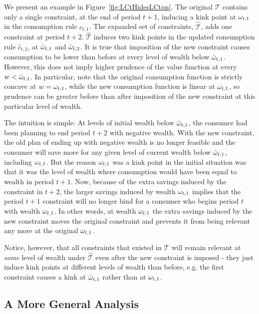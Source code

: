 We present an example in Figure~\ref{fig:LCtHidesLCtpn}. The original $\mathcal{T}$ contains only a single constraint, at the end of period $t+1$, inducing a kink point at $\omega_{t,1}$ in the consumption rule $c_{t,1}$. The expanded set of constraints, $\hat{\mathcal{T}}$, adds one constraint at period $t+2$. $\hat{\mathcal{T}}$ induces two kink points in the updated consumption rule $\hat{c}_{t,2}$, at $\hat{\omega}_{t,1}$ and $\hat{\omega}_{t,2}$.  It is true that imposition of the new constraint causes consumption to be lower than before at every level of wealth below $\hat{\omega}_{t,1}$.  However, this does not imply higher prudence of the value function at every $w <\hat{\omega}_{t,1}$.  In particular, note that the original consumption function is strictly concave at $w = \omega_{t,1}$, while the new consumption function is linear at $\omega_{t,1}$, so prudence can be greater before than after imposition of the new constraint at this particular level of wealth.

The intuition is simple: At levels of initial wealth below $\hat{\omega}_{t,1}$, the consumer had been planning to end period $t+2$ with negative wealth. With the new constraint, the old plan of ending up with negative wealth is no longer feasible and the consumer will save more for any given level of current wealth below $\hat{\omega}_{t,1}$, including $\omega_{t,1}$. But the reason $\omega_{t,1}$ was a kink point in the initial situation was that it was the level of wealth where consumption would have been equal to wealth in period $t+1$. Now, because of the extra savings induced by the constraint in $t+2$, the larger savings induced by wealth $\omega_{t,1}$ implies that the period $t+1$ constraint will no longer bind for a consumer who begins period $t$ with wealth $\omega_{t,1}$. In other words, at wealth $\omega_{t,1}$ the extra savings induced by the new constraint moves the original constraint and prevents it from being relevant any more at the original $\omega_{t,1}$.

Notice, however, that all constraints that existed in $\mathcal{T}$ will remain relevant at \textit{some} level of wealth under $\hat{\mathcal{T}}$ even after the new constraint is imposed - they just induce kink points at different levels of wealth than before, e.g. the first constraint causes a kink at $\hat{\omega}_{t,1}$ rather than at $\omega_{t,1}$.

\subsection{A More General Analysis}
\label{subsubsec:MoreGenConstr}

